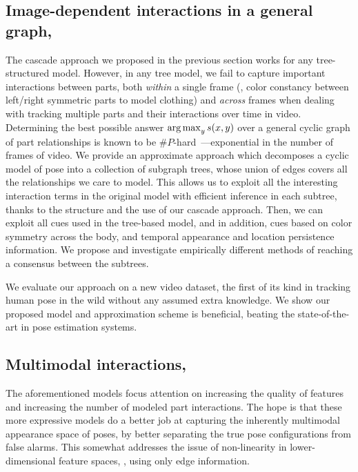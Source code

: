 \subsection{Image-dependent interactions in a general 
graph,~}
The cascade approach we proposed in the previous section works for any 
tree-structured model.  However, in any tree model, we fail to capture 
important interactions between parts, both {\em within} a single frame (\eg, 
color constancy between left/right symmetric parts to model clothing) and {\em 
across} frames when dealing with tracking multiple parts and their interactions 
over time in video.  Determining the best possible answer $\mathop{\arg\max}_y s(x,y)$ 
over a general cyclic graph of part relationships is known to be 
$\#P$-hard~\citep{koller-book}---exponential in the number of frames of video.  
We provide an approximate approach which decomposes a cyclic model of pose  
into a collection of subgraph trees, whose union of edges covers all the 
relationships we care to model.  This allows us to exploit all the interesting 
interaction terms in the original model with efficient inference in each 
subtree, thanks to the structure and the use of our cascade approach.
Then, we can exploit all cues used in the tree-based model, and in addition, 
cues based on color symmetry across the body, and temporal appearance and 
location persistence information.  We propose and investigate empirically 
different methods of reaching a consensus between the subtrees.

We evaluate our approach on a new video dataset, the first of its kind in 
tracking human pose in the wild without any assumed extra knowledge. We show 
our proposed model and approximation scheme is beneficial, beating the 
state-of-the-art in pose estimation systems.

\subsection{Multimodal interactions,~}
\label{sec:contrib3}
The aforementioned models focus attention on increasing the quality of features 
and increasing the number of modeled part interactions.  The hope is that these 
more expressive models do a better job at capturing the inherently multimodal 
appearance space of poses, by better separating the true pose configurations 
from false alarms.  This somewhat addresses the issue of non-linearity in 
lower-dimensional feature spaces, \eg, using only edge information.

